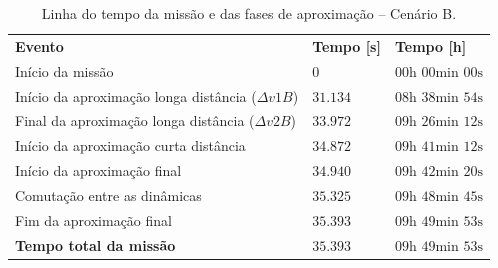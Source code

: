 \begin{table}[H]
\centering
\caption{Linha do tempo da missão e das fases de aproximação -- Cenário B.}
\label{tab:cap4_linha_tempo_B}
\begin{tabularx}{\linewidth}{|
  >{\raggedright\arraybackslash}X|
  >{\centering\arraybackslash}X|
  >{\centering\arraybackslash}X|}
\hline
\textbf{Evento} &
\textbf{Tempo [s]} &
\textbf{Tempo [h]} \\
\hhline{|=|=|=|}
Início da missão  & $0$ & $00\text{h }00\text{min }00\text{s}$ \\
\hline
Início da aproximação longa distância ($\Delta v1B$) &$31.134$ &$08\text{h }38\text{min }54\text{s}$ \\
\hline
Final da aproximação longa distância ($\Delta v2B$) &$33.972$ &$09\text{h }26\text{min }12\text{s}$ \\
\hline
Início da aproximação curta distância  &$34.872$ &$09\text{h }41\text{min }12\text{s}$ \\
\hline
Início da aproximação final  &$34.940$ &$09\text{h }42\text{min }20\text{s}$ \\
\hline
Comutação entre as dinâmicas & $35.325$ & $09\text{h }48\text{min }45\text{s}$ \\
\hline
Fim da aproximação final  &$35.393$ &$09\text{h }49\text{min }53\text{s}$ \\
\hline
\textbf{Tempo total da missão}  &$35.393$ &$09\text{h }49\text{min }53\text{s}$ \\
\hline
\end{tabularx}
\end{table}
